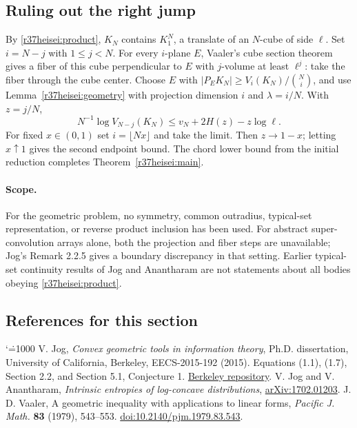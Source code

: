 \documentclass[11pt,a4paper]{article}
\makeatletter
\numberwithin{equation}{section}
\theoremstyle{definition}
\theoremstyle{remark}
\renewenvironment{thebibliography}[1]
 {\subsection*{References for this section}\small
  \list{\@biblabel{\@arabic\c@enumiv}}
       {\settowidth\labelwidth{\@biblabel{#1}}\leftmargin\labelwidth
        \advance\leftmargin\labelsep\@openbib@code
        \usecounter{enumiv}\let\p@enumiv\@empty
        \renewcommand\theenumiv{\@arabic\c@enumiv}}
  \sloppy\clubpenalty4000\widowpenalty4000\sfcode`\.=1000\relax}
 {\def\@noitemerr{\@latex@warning{Empty bibliography}}\endlist}
\makeatother
\begin{document}
\subsection{Ruling out the right jump}
By \eqref{r37heisei:product}, $K_N$ contains $K_1^N$, a translate of an $N$-cube of side $\ell$. Set $i=N-j$ with $1\le j<N$. For every $i$-plane $E$, Vaaler's cube section theorem \cite{r37heisei:vaaler} gives a fiber of this cube perpendicular to $E$ with $j$-volume at least $\ell^j$: take the fiber through the cube center. Choose $E$ with $|P_EK_N|\ge V_i(K_N)/\binom Ni$, and use Lemma~\ref{r37heisei:geometry} with projection dimension $i$ and $\lambda=i/N$. With $z=j/N$,
\begin{equation}
 N^{-1}\log V_{N-j}(K_N)\le v_N+2H(z)-z\log\ell.
 \label{r37heisei:right}
\end{equation}
For fixed $x\in(0,1)$ set $i=\lfloor Nx\rfloor$ and take the limit. Then $z\to1-x$; letting $x\uparrow1$ gives the second endpoint bound. The chord lower bound from the initial reduction completes Theorem~\ref{r37heisei:main}.

\paragraph{Scope.} For the geometric problem, no symmetry, common outradius, typical-set representation, or reverse product inclusion has been used. For abstract super-convolution arrays alone, both the projection and fiber steps are unavailable; Jog's Remark 2.2.5 gives a boundary discrepancy in that setting. Earlier typical-set continuity results of Jog and Anantharam \cite{r37heisei:ja} are not statements about all bodies obeying \eqref{r37heisei:product}.

\begin{thebibliography}{9}
 V. Jog, \emph{Convex geometric tools in information theory}, Ph.D. dissertation, University of California, Berkeley, EECS-2015-192 (2015). Equations (1.1), (1.7), Section 2.2, and Section 5.1, Conjecture 1.
\href{https://www2.eecs.berkeley.edu/Pubs/TechRpts/2015/Archive/EECS-2015-192.pdf}{Berkeley repository}.
 V. Jog and V. Anantharam, \emph{Intrinsic entropies of log-concave distributions}, \href{https://arxiv.org/abs/1702.01203}{arXiv:1702.01203}.
 J. D. Vaaler, A geometric inequality with applications to linear forms, \emph{Pacific J. Math.} \textbf{83} (1979), 543--553. \href{https://doi.org/10.2140/pjm.1979.83.543}{doi:10.2140/pjm.1979.83.543}.
\end{thebibliography}
\end{document}
